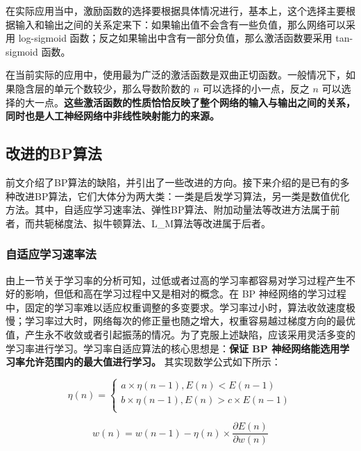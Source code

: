 \documentclass[UTF8]{ctexart}
\begin{document}
在实际应用当中，激励函数的选择要根据具体情况进行，基本上，这个选择主要根据输入和输出之间的关系定来下：如果输出值不会含有一些负值，那么网络可以采用 log-sigmoid 函数；反之如果输出中含有一部分负值，那么激活函数要采用 tan-sigmoid 函数。 \par

在当前实际的应用中，使用最为广泛的激活函数是双曲正切函数。一般情况下，如果隐含层的单元个数较少，那么导数阶数的 $n$ 可以选择的小一点，反之 $n$ 可以选择的大一点。\textbf{这些激活函数的性质恰恰反映了整个网络的输入与输出之间的关系，同时也是人工神经网络中非线性映射能力的来源。}

\subsection{改进的BP算法}

前文介绍了BP算法的缺陷，并引出了一些改进的方向。接下来介绍的是已有的多种改进BP算法，它们大体分为两大类：一类是启发学习算法，另一类是数值优化方法。其中，自适应学习速率法、弹性BP算法、附加动量法等改进方法属于前者，而共轭梯度法、拟牛顿算法、L\_M算法等改进属于后者。 \par


\subsubsection{自适应学习速率法}

由上一节关于学习率的分析可知，过低或者过高的学习率都容易对学习过程产生不好的影响，但低和高在学习过程中又是相对的概念。在 BP 神经网络的学习过程中，固定的学习率难以适应权重调整的多变要求。学习率过小时，算法收敛速度极慢；学习率过大时，网络每次的修正量也随之增大，权重容易越过梯度方向的最优值，产生永不收敛或者引起振荡的情况。为了克服上述缺陷，应该采用灵活多变的学习率进行学习。学习率自适应算法的核心思想是：\textbf{保证 BP 神经网络能选用学习率允许范围内的最大值进行学习。} 其实现数学公式如下所示： \par

\begin{equation}
\eta(n)=\begin{cases}
a \times \eta (n-1), E(n) < E(n-1) \\
b \times \eta (n-1), E(n) > c \times E(n-1) \\
\end{cases}
\end{equation}

\begin{equation}
w(n) = w(n-1) - \eta(n) \times \frac{\partial E(n)}{\partial w(n)}
\end{equation}
\end{document}
